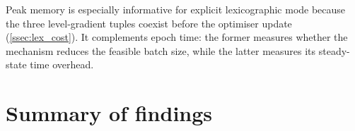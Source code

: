 Peak memory is especially informative for explicit lexicographic mode because
the three level-gradient tuples coexist before the optimiser update
(\cref{ssec:lex_cost}). It complements epoch time: the former measures whether
the mechanism reduces the feasible batch size, while the latter measures its
steady-state time overhead.

\section{Summary of findings}
\label{sec:results_summary}

